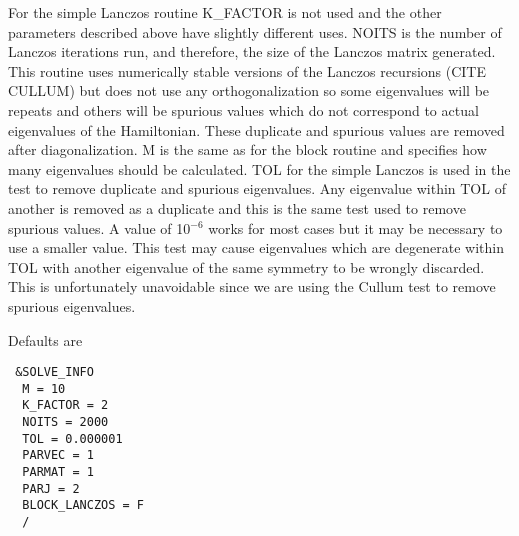 \documentclass{article}
\begin{document}
For the simple Lanczos routine K\_FACTOR is not used and the other parameters described above
have slightly different uses. NOITS is the number of Lanczos iterations run, and therefore, the
size of the Lanczos matrix generated. This routine uses numerically stable versions of the Lanczos recursions (CITE CULLUM) but does not use any orthogonalization so some
eigenvalues will be repeats and others will be spurious values which do not correspond to actual
eigenvalues of the Hamiltonian. These duplicate and spurious values are removed after diagonalization. M is the same as for the block routine and specifies how many eigenvalues should be calculated. TOL for the simple Lanczos is used
in the test to remove duplicate and spurious eigenvalues. Any eigenvalue within TOL of another
is removed as a duplicate and this is the same test used to remove spurious values. A value
of 10$^{-6}$ works for most cases but it may be necessary to use a smaller value. This test may cause eigenvalues which are degenerate within TOL with another eigenvalue of the same symmetry to be wrongly discarded. This is unfortunately unavoidable since we are using the Cullum test to remove spurious eigenvalues.

Defaults are

\begin{verbatim}
 &SOLVE_INFO
  M = 10
  K_FACTOR = 2
  NOITS = 2000
  TOL = 0.000001
  PARVEC = 1
  PARMAT = 1
  PARJ = 2
  BLOCK_LANCZOS = F
  /
\end{verbatim}
\end{document}
